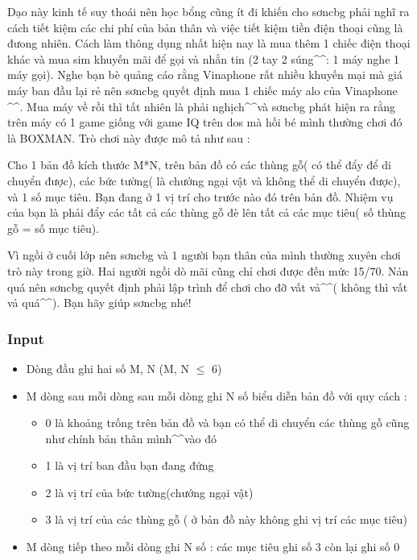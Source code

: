 

Dạo này kinh tế suy thoái nên học bổng cũng ít đi khiến cho sơncbg phải nghĩ ra cách tiết kiệm các chi phí của bản thân và việc tiết kiệm tiền điện thoại cũng là đưong nhiên. Cách làm thông dụng nhất hiện nay là mua thêm 1 chiếc điện thoại khác và mua sim khuyến mãi để gọi và nhắn tin (2 tay 2 súng\textasciicircum\textasciicircum : 1 máy nghe 1 máy gọi). Nghe bạn bè quảng cáo rằng Vinaphone rất nhiều khuyến mại mà giá máy ban đầu lại rẻ nên sơncbg quyết định mua 1 chiếc máy alo của Vinaphone \textasciicircum\textasciicircum. Mua máy về rồi thì tất nhiên là phải nghịch\textasciicircum\textasciicircum và sơncbg phát hiện ra rằng trên máy có 1 game giống với game IQ trên dos mà hồi bé mình thường chơi đó là BOXMAN. Trò chơi này được mô tả như sau :

Cho 1 bản đồ kích thước M*N, trên bản đồ có các thùng gỗ( có thể đẩy để di chuyển được), các bức tường( là chướng ngại vật và không thể di chuyển được), và 1 số mục tiêu. Bạn đang ở 1 vị trí cho trước nào đó trên bản đồ. Nhiệm vụ của bạn là phải đẩy các tất cả các thùng gỗ đè lên tất cả các mục tiêu( số thùng gỗ = số mục tiêu).

Vì ngồi ở cuối lớp nên sơncbg và 1 người bạn thân của mình thường xuyên chơi trò này trong giờ. Hai người ngồi dò mãi cũng chỉ chơi được đến mức 15/70. Nản quá nên sơncbg quyết định phải lập trình để chơi cho đỡ vất vả\textasciicircum\textasciicircum( không thì vất vả quá\textasciicircum\textasciicircum). Bạn hãy giúp sơncbg nhé!

\subsubsection{Input}
\begin{itemize}
	\item Dòng đầu ghi hai số M, N (M, N  $\le$  6)
	\item M dòng sau mỗi dòng sau mỗi dòng ghi N số biểu diễn bản đồ với quy cách :
\begin{itemize}
	\item 0 là khoảng trống trên bản đồ và bạn có thể di chuyển các thùng gỗ cũng như chính bản thân mình\textasciicircum\textasciicircum vào đó
	\item 1 là vị trí ban đầu bạn đang đứng
	\item 2 là vị trí của bức tường(chướng ngại vật)
	\item 3 là vị trí của các thùng gỗ ( ở bản đồ này không ghi vị trí các mục tiêu)
\end{itemize}
	\item M dòng tiếp theo mỗi dòng ghi N số : các mục tiêu ghi số 3 còn lại ghi số 0
\end{itemize}

